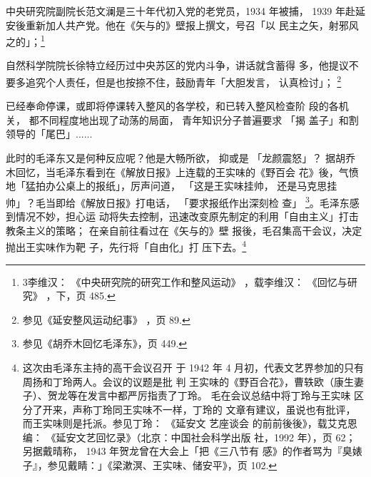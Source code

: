 中央研究院副院长范文澜是三十年代初入党的老党员，1934 年被捕，
1939 年赴延安後重新加人共产党。他在《矢与的》壁报上撰文，号召「以
民主之矢，射邪风之的」；\footnote{3李维汉：
《中央研究院的研究工作和整风运动》
，载李维汉：
《回忆与研究》
，下，页 485.} 

自然科学院院长徐特立经历过中央苏区的党内斗争，讲话就含蓄得
多，他提议不要多追究个人责任，但是也按捺不住，鼓励青年「大胆发言，
认真检讨」； \footnote{参见《延安整风运动纪事》
，页 89.} 

已经奉命停课，或即将停课转入整风的各学校，和已转入整风检查阶
段的各机关，
都不同程度地出现了动荡的局面，
青年知识分子普遍要求
「揭
盖子」和割领导的「尾巴」......

此时的毛泽东又是何种反应呢？他是大畅所欲， 抑或是 「龙颜震怒」？ 据胡乔
木回忆，当毛泽东看到在《解放日报》上连载的王实味的《野百会 花》後，气愤
地「猛拍办公桌上的报纸」，厉声问道， 「这是王实味挂帅， 还是马克思挂
帅」？毛当即给《解放日报》打电话， 「要求报纸作出深刻检 查」
\footnote{参见《胡乔木回忆毛泽东》，页 449.}。毛泽东感到情况不妙，担心运
动将失去控制，迅速改变原先制定的利用「自由主义」打击教条主义的策略；
在亲自前往看过在《矢与的》壁 报後，毛召集高干会议，决定抛出王实味作为靶
子，先行将「自由化」打 压下去。\footnote{这次由毛泽东主持的高干会议召开
于 1942 年 4 月初，代表文艺界参加的只有周扬和丁玲两人。会议的议题是批 判
王实味的《野百合花》，曹轶欧（康生妻子）、贺龙等在发言中都严厉指责了丁玲。
毛在会议总结中将丁玲与王实味 区分了开来，声称丁玲同王实味不一样，丁玲的
文章有建议，虽说也有批评，而王实味则是托派。参见丁玲： 《延安文 艺座谈会
的前前後後》，载艾克恩编： 《延安文艺回忆录》（北京：中国社会科学出版
社，1992 年），页 62；另据戴晴称， 1943 年贺龙曾在大会上「把《三八节有
感》的作者骂为『臭婊子』，参见戴睛：」《梁漱溟、王实味、储安平》，页
102.} 

